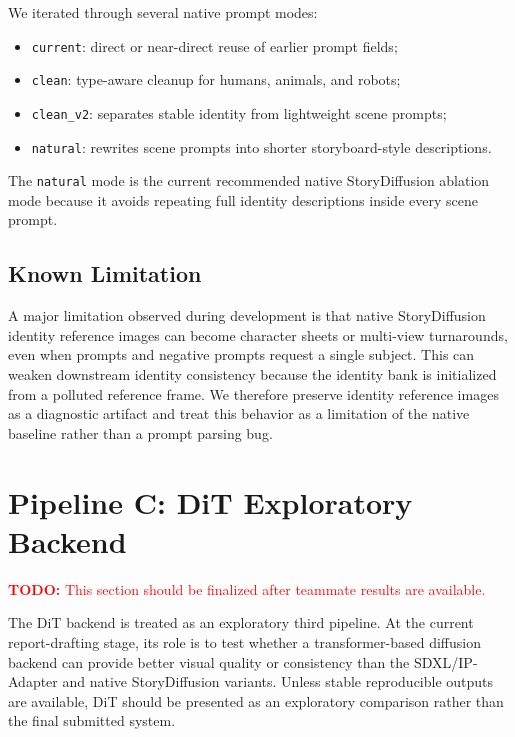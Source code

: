 \documentclass[11pt,a4paper]{article}
\newcommand{\todo}[1]{\textcolor{red}{\textbf{TODO:} #1}}
\begin{document}
We iterated through several native prompt modes:

\begin{itemize}[leftmargin=*]
    \item \texttt{current}: direct or near-direct reuse of earlier prompt fields;
    \item \texttt{clean}: type-aware cleanup for humans, animals, and robots;
    \item \texttt{clean\_v2}: separates stable identity from lightweight scene prompts;
    \item \texttt{natural}: rewrites scene prompts into shorter storyboard-style descriptions.
\end{itemize}

The \texttt{natural} mode is the current recommended native StoryDiffusion ablation mode because it avoids repeating full identity descriptions inside every scene prompt.

\subsection{Known Limitation}

A major limitation observed during development is that native StoryDiffusion identity reference images can become character sheets or multi-view turnarounds, even when prompts and negative prompts request a single subject. This can weaken downstream identity consistency because the identity bank is initialized from a polluted reference frame. We therefore preserve identity reference images as a diagnostic artifact and treat this behavior as a limitation of the native baseline rather than a prompt parsing bug.

\section{Pipeline C: DiT Exploratory Backend}
\label{sec:pipeline_c}

\todo{This section should be finalized after teammate results are available.}

The DiT backend is treated as an exploratory third pipeline. At the current report-drafting stage, its role is to test whether a transformer-based diffusion backend can provide better visual quality or consistency than the SDXL/IP-Adapter and native StoryDiffusion variants. Unless stable reproducible outputs are available, DiT should be presented as an exploratory comparison rather than the final submitted system.
\end{document}
